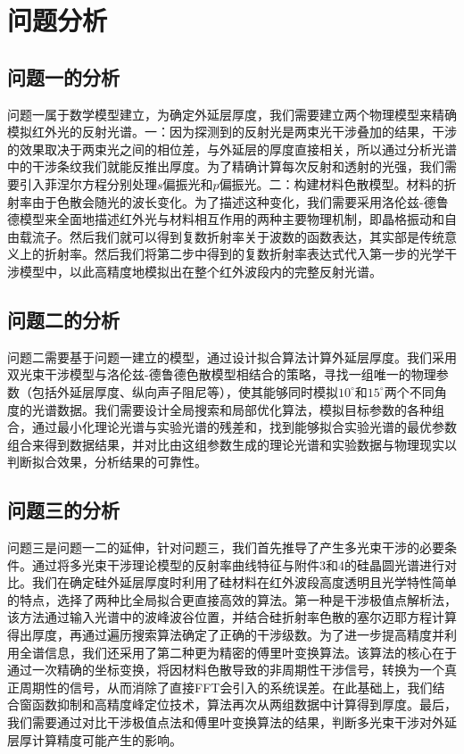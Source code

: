 \documentclass[a4paper]{ctexart}
\begin{document}
\section{问题分析}

\subsection{问题一的分析}
问题一属于数学模型建立，为确定外延层厚度，我们需要建立两个物理模型来精确模拟红外光的反射光谱。一：因为探测到的反射光是两束光干涉叠加的结果，干涉的效果取决于两束光之间的相位差，与外延层的厚度直接相关，所以通过分析光谱中的干涉条纹我们就能反推出厚度。为了精确计算每次反射和透射的光强，我们需要引入菲涅尔方程分别处理$s$偏振光和$p$偏振光。二：构建材料色散模型。材料的折射率由于色散会随光的波长变化。为了描述这种变化，我们需要采用洛伦兹-德鲁德模型来全面地描述红外光与材料相互作用的两种主要物理机制，即晶格振动和自由载流子。然后我们就可以得到复数折射率关于波数的函数表达，其实部是传统意义上的折射率。然后我们将第二步中得到的复数折射率表达式代入第一步的光学干涉模型中，以此高精度地模拟出在整个红外波段内的完整反射光谱。

\subsection{问题二的分析}
问题二需要基于问题一建立的模型，通过设计拟合算法计算外延层厚度。我们采用双光束干涉模型与洛伦兹-德鲁德色散模型相结合的策略，寻找一组唯一的物理参数（包括外延层厚度、纵向声子阻尼等），使其能够同时模拟$10^{\circ}$和$15^{\circ}$两个不同角度的光谱数据。我们需要设计全局搜索和局部优化算法，模拟目标参数的各种组合，通过最小化理论光谱与实验光谱的残差和，找到能够拟合实验光谱的最优参数组合来得到数据结果，并对比由这组参数生成的理论光谱和实验数据与物理现实以判断拟合效果，分析结果的可靠性。

\subsection{问题三的分析}
问题三是问题一二的延伸，针对问题三，我们首先推导了产生多光束干涉的必要条件。通过将多光束干涉理论模型的反射率曲线特征与附件3和4的硅晶圆光谱进行对比。我们在确定硅外延层厚度时利用了硅材料在红外波段高度透明且光学特性简单的特点，选择了两种比全局拟合更直接高效的算法。第一种是干涉极值点解析法，该方法通过输入光谱中的波峰波谷位置，并结合硅折射率色散的塞尔迈耶方程计算得出厚度，再通过遍历搜索算法确定了正确的干涉级数。为了进一步提高精度并利用全谱信息，我们还采用了第二种更为精密的傅里叶变换算法。该算法的核心在于通过一次精确的坐标变换，将因材料色散导致的非周期性干涉信号，转换为一个真正周期性的信号，从而消除了直接FFT会引入的系统误差。在此基础上，我们结合窗函数抑制和高精度峰定位技术，算法再次从两组数据中计算得到厚度。最后，我们需要通过对比干涉极值点法和傅里叶变换算法的结果，判断多光束干涉对外延层厚计算精度可能产生的影响。
\end{document}
